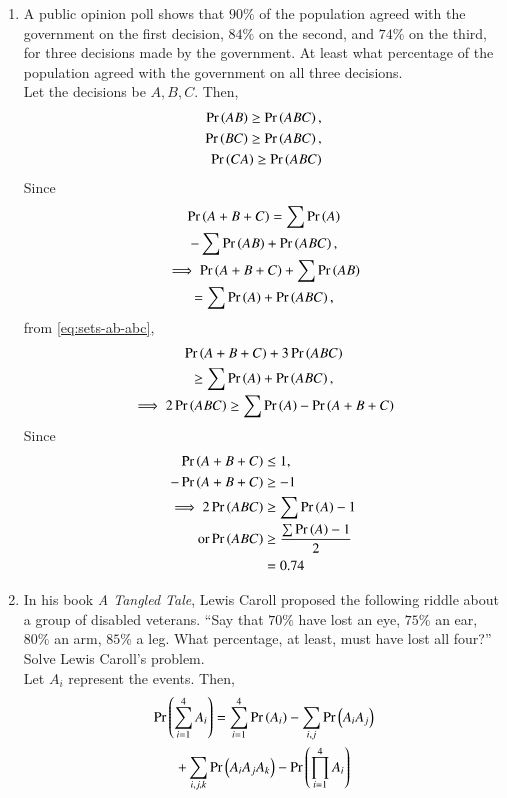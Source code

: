 \begin{enumerate}[label=\arabic*.,ref=\thesubsection.\theenumi]
\item A public opinion poll shows that $90 \%$ of the population agreed with the government on the first decision, $84 \%$ on the second, and $74\%$ on the third, for three decisions made by the government.  At least what percentage
	of the population agreed with the government on all three decisions.
	\\
	\solution Let the decisions be $A, B, C$.  Then, 
\begin{align}
	\label{eq:sets-ab-abc}
	\Pr\left(AB\right) \ge \Pr\left(ABC\right),
	\\
	\Pr\left(BC\right) \ge \Pr\left(ABC\right),
	\\
	\Pr\left(CA\right) \ge \Pr\left(ABC\right)
\end{align}
Since 
\begin{multline}
	\Pr\left(A+B+C\right) = \sum\Pr\left(A\right) 
	\\
	- \sum \Pr\left(AB\right) + \Pr\left(ABC\right), 
	\\
\implies 	\Pr\left(A+B+C\right) + \sum \Pr\left(AB\right)  
	\\
	= \sum\Pr\left(A\right) + \Pr\left(ABC\right), 
\end{multline}
	from \eqref{eq:sets-ab-abc},
\begin{multline}
\Pr\left(A+B+C\right) + 3\Pr\left(ABC\right)  
	\\
	\ge \sum\Pr\left(A\right) + \Pr\left(ABC\right), 
\\
\implies 
 2\Pr\left(ABC\right)   \ge \sum\Pr\left(A\right) - \Pr\left(A+B+C\right)
\end{multline}
Since 
\begin{align}
	\Pr\left(A+B+C\right) &\le 1,
	\\
	-\Pr\left(A+B+C\right) &\ge -1
	\\
	\implies 
 2\Pr\left(ABC\right)  & \ge \sum\Pr\left(A\right) - 1
 \\
	\text{or}
	\Pr\left(ABC\right)  & \ge \frac{\sum\Pr\left(A\right) - 1}{2}
	\\
	&= 0.74
\end{align}
\item In his book {\em A Tangled Tale}, Lewis Caroll proposed the following riddle about a group of disabled veterans.  ``Say that $70\%$ have lost an eye, $75\%$ an ear, $80\%$ an arm, $85\%$ a leg.  What percentage, at least, must
	have lost all four?''  Solve Lewis Caroll's problem.
	\\
	\solution Let $A_i$ represent the events.  Then, 
\begin{multline}
	\Pr\left(\sum_{i=1}^{4}A_i\right) = \sum_{i=1}^{4}\Pr\left(A_i\right) 
	- \sum_{i,j} \Pr\left(A_iA_j\right) 
	\\
	+ \sum_{i,j,k} \Pr\left(A_iA_jA_k\right) - \Pr\left(\prod_{i = 1}^{4}A_i\right) 
	\label{eq:1.2-caroll-first}
\end{multline}

\end{enumerate}
